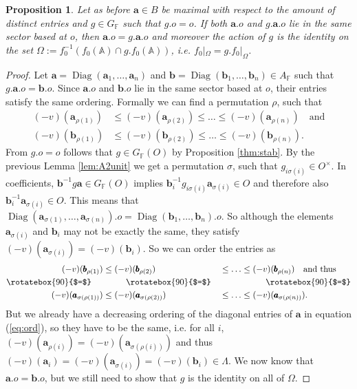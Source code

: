 \documentclass[12pt]{amsart}
\newcommand{\F}{\mathbb{F} }
\newcommand{\A}{\mathbb{A}}
\newcommand{\diag}[1]{\operatorname{Diag}\left( #1_1, \ldots , #1_n\right) }
\numberwithin{equation}{section}
\newtheorem{proposition}[theorem]{Proposition}
\theoremstyle{remark} %
\begin{document}
\begin{proposition}
	\label{pro:A2id}
	Let as before $\pmb{a}\in B$ be maximal with respect to the amount of distinct entries and $g \in G_\F$ such that $g.o=o$. If both $\pmb{a}.o$ and $g.\pmb{a}.o$ lie in the same sector based at $o$, then $\pmb{a}.o=g.\pmb{a}.o$ and moreover the action of $g$ is the identity on the set $\Omega := f_0^{-1}\left( f_0(\A)\cap g.f_0(\A) \right)$, i.e. $f_0|_\Omega = g.f_0|_\Omega$.
\end{proposition}
\begin{proof} Let $\pmb{a} = \diag{\pmb{a}}$ and $\pmb{b} = \diag{\pmb{b}} \in A_\F$ such that $g.\pmb{a}.o = \pmb{b}.o$. Since $\pmb{a}.o$ and $\pmb{b}.o$ lie in the same sector based at $o$, their entries satisfy the same ordering. Formally we can find a permutation $\rho$, such that 
	\begin{align}\label{eq:ord}
		(-v)(\pmb{a}_{\rho(1)}) & \leq (-v)(\pmb{a}_{\rho(2)}) \leq \ldots \leq (-v)(\pmb{a}_{\rho(n)}) \quad \text{and} \\
		(-v)(\pmb{b}_{\rho(1)}) & \leq (-v)(\pmb{b}_{\rho(2)}) \leq \ldots \leq (-v)(\pmb{b}_{\rho(n)}). \nonumber
	\end{align}
	From $g.o=o$ follows that $g\in G_\F(O)$ by Proposition \ref{thm:stab}. By the previous Lemma \ref{lem:A2unit} we get a permutation $\sigma$, such that $g_{i\sigma(i)}\in O^\times$. In coefficients, $\pmb{b}^{-1}g\pmb{a} \in G_\F(O)$ implies $\pmb{b}_i^{-1}g_{i\sigma(i)}\pmb{a}_{\sigma(i)} \in O$ and therefore also $\pmb{b}_i^{-1}\pmb{a}_{\sigma(i)} \in O$. This means that $\operatorname{Diag}( \pmb{a}_{\sigma(1)}, \ldots , \pmb{a}_{\sigma(n)}).o=\diag{\pmb{b}}.o$. So although the elements $\pmb{a}_{\sigma(i)}$ and $\pmb{b}_{i}$ may not be exactly the same, they satisfy $(-v)(\pmb{a}_{\sigma(i)}) = (-v)(\pmb{b}_i)$. So we can order the entries as
	\begin{alignat}{3}
		\label{eq:ineq}
		(-v)(\pmb{b}_{\rho(1)}) & \leq (-v)(\pmb{b}_{\rho(2)})&& \leq \ldots \leq (-v)(\pmb{b}_{\rho(n)}) \quad \text{and thus} \\
		\rotatebox{90}{$=$}\ \ \ \ & \quad \ \quad \ \rotatebox{90}{$=$} && \quad \quad \quad \quad \quad \ \rotatebox{90}{$=$} \nonumber
		\\
		(-v)(\pmb{a}_{\sigma(\rho(1))}) & \leq (-v)(\pmb{a}_{\sigma(\rho(2))})&& \leq \ldots \leq (-v)(\pmb{a}_{\sigma(\rho(n))}). \nonumber
	\end{alignat}
	But we already have a decreasing ordering of the diagonal entries of $\pmb{a}$ in equation (\ref{eq:ord}), so they have to be the same, i.e. for all $i$, $(-v)(\pmb{a}_{\rho(i)})=(-v)(\pmb{a}_{\sigma(\rho(i))})$ and thus $(-v)(\pmb{a}_i) = (-v)(\pmb{a}_{\sigma(i)})=(-v)(\pmb{b}_i) \in \Lambda$. We now know that $\pmb{a}.o=\pmb{b}.o$, but we still need to show that $g$ is the identity on all of $\Omega$. 
	

\end{proof}
\end{document}
